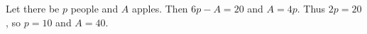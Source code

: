 Let there be $p$ people and $A$ apples. Then $6p-A=20$ and $A=4p$. Thus $2p=20$, so $p=10$ and $\boxed{A=40}$.
